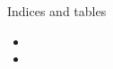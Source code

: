 \documentclass[a4paper,11pt,english]{sphinxmanual}
\let\originalchapter=\chapter
\renewcommand*{\chapter}{%
    \secdef{\Chap}{\ChapS}%
}
\newcommand\ChapS[1]{\originalchapter*{#1}%
                     \addcontentsline{toc}{chapter}{#1}%
                     \localtableofcontents
                     \cleardoublepage
}
\newcommand\Chap[2][]{\originalchapter[#1]{#2}%
                      \localtableofcontents
                      \cleardoublepage
                     }
\begin{document}
\chapter{Indices and tables}
\label{\detokenize{index:indices-and-tables}}\begin{itemize}
\item {} 
\sphinxAtStartPar
{}

\item {} 
\sphinxAtStartPar
{}

\end{itemize}

\listoffigures
\listoftables



\renewcommand{\indexname}{Index}
\printindex
\end{document}
